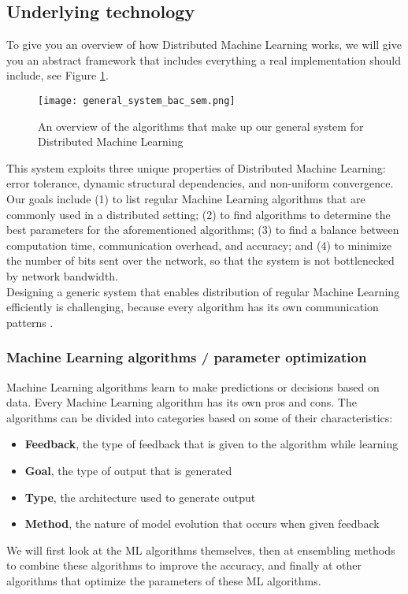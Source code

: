 \subsection{Underlying technology}
To give you an overview of how Distributed Machine Learning works, we will give you an abstract framework that includes everything a real implementation should include, see Figure \ref{overview_system}.\\
\begin{figure}[H]
	\begin{center}
		\texttt{[image: general\_system\_bac\_sem.png]}
		\caption{An overview of the algorithms that make up our general system for Distributed Machine Learning}
		\label{overview_system}
	\end{center}
\end{figure}
\newpage
This system exploits three unique properties of Distributed Machine Learning: error tolerance, dynamic structural dependencies, and non-uniform convergence.\cite{Xing16}\\
Our goals include (1) to list regular Machine Learning algorithms that are commonly used in a distributed setting; (2) to find algorithms to determine the best parameters for the aforementioned algorithms; (3) to find a balance between computation time, communication overhead, and accuracy; and (4) to minimize the number of bits sent over the network, so that the system is not bottlenecked by network bandwidth.\\
Designing a generic system that enables distribution of  regular Machine Learning efficiently is challenging, because every algorithm has its own communication patterns \cite{Jia14}\cite{Newman09}\cite{Rich13}\cite{Smola10}\cite{Takac13}\cite{Tsi12}.

\subsubsection{Machine Learning algorithms / parameter optimization}
Machine Learning algorithms learn to make predictions or decisions based on data. Every Machine Learning algorithm has its own pros and cons. The algorithms can be divided into categories based on some of their characteristics:
\begin{itemize}
	\item \textbf{Feedback}, the type of feedback that is given to the algorithm while learning
	\item \textbf{Goal}, the type of output that is generated
	\item \textbf{Type}, the architecture used to generate output
	\item \textbf{Method}, the nature of model evolution that occurs when given feedback
\end{itemize}
We will first look at the ML algorithms themselves, then at ensembling methods to combine these algorithms to improve the accuracy, and finally at other algorithms that optimize the parameters of these ML algorithms.

